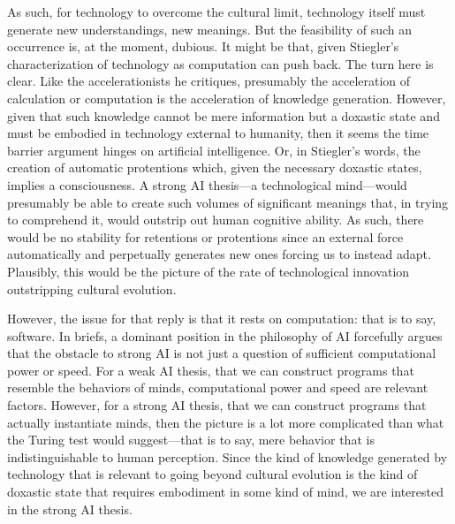\documentclass[letterpaper,notitlepage,12pt]{article}
\begin{document}
As such, for technology to overcome the cultural limit, technology itself must
generate new understandings, new meanings.
But the feasibility of such an occurrence is, at the moment, dubious.
It might be that, given Stiegler's characterization of technology as computation
can push back.
The turn here is clear.
Like the accelerationists he critiques, presumably the acceleration of
calculation or computation is the acceleration of knowledge generation.
However, given that such knowledge cannot be mere information but a doxastic
state and must be embodied in technology external to humanity, then it seems
the time barrier argument hinges on artificial intelligence.
Or, in Stiegler's words, the creation of automatic protentions which, given the
necessary doxastic states, implies a consciousness.
A strong AI thesis---a technological mind---would presumably be able to create
such volumes of significant meanings that, in trying to comprehend it, would
outstrip out human cognitive ability.
As such, there would be no stability for retentions or protentions since an
external force automatically and perpetually generates new ones forcing us to
instead adapt.
Plausibly, this would be the picture of the rate of technological innovation
outstripping cultural evolution.

However, the issue for that reply is that it rests on computation: that is to
say, software.
In briefs, a dominant position in the philosophy of AI forcefully argues that the
obstacle to strong AI is not just a question of sufficient computational power
or speed.
For a weak AI thesis, that we can construct programs that resemble the behaviors
of minds, computational power and speed are relevant factors.
However, for a strong AI thesis, that we can construct programs that actually
instantiate minds, then the picture is a lot more complicated than what the
Turing test would suggest---that is to say, mere behavior that is
indistinguishable to human perception.
Since the kind of knowledge generated by technology that is relevant to going
beyond cultural evolution is the kind of doxastic state that requires
embodiment in some kind of mind, we are interested in the strong AI thesis.
\end{document}
